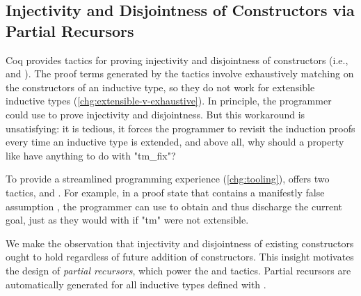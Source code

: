%
%
%
%
%
%


\subsection{Injectivity and Disjointness of Constructors via Partial Recursors}


Coq provides tactics for proving injectivity and disjointness of constructors
(i.e.,  and ).
The proof terms generated by the tactics involve exhaustively
matching on the constructors of an inductive type, so
they do not work for extensible inductive types (\ref{chg:extensible-v-exhaustive}).
%
In principle, the programmer could use  to prove
injectivity and disjointness.
But this workaround is unsatisfying:
it is tedious, it forces the programmer to revisit
the induction proofs every time an inductive type is extended,
and above all, why should a property like
 have anything to do with "tm_fix"?

To provide a streamlined programming experience (\ref{chg:tooling}),
\Lang offers two tactics,  and .
For example, in a proof state that contains a manifestly false assumption
, the programmer can use
 to obtain  and thus discharge
the current goal, just as they would with  if "tm"
were not extensible.



We make the observation
that injectivity and disjointness of existing constructors ought to hold
regardless of future addition of constructors.
%
This insight motivates the design of \emph{partial recursors}, which
power the  and  tactics.
Partial recursors are automatically generated for all inductive types
defined with .

